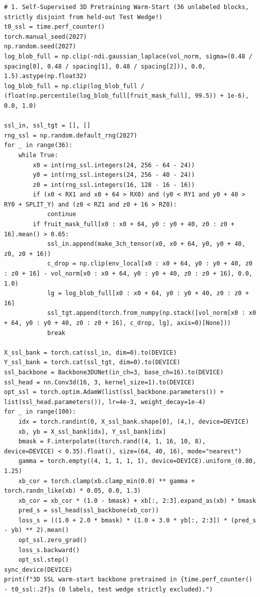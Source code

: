 \documentclass[10pt,a4paper]{article}
\begin{document}
\begin{codebox}[{In [4] $\cdot$ Python --- Step 4 -- Controlled 5-model ablation study (SSL warm-start, Organ-GPS, p=1 vs p=3, calibration)}]
\begin{lstlisting}[style=pybmed]
# 1. Self-Supervised 3D Pretraining Warm-Start (36 unlabeled blocks, strictly disjoint from held-out Test Wedge!)
t0_ssl = time.perf_counter()
torch.manual_seed(2027)
np.random.seed(2027)
log_blob_full = np.clip(-ndi.gaussian_laplace(vol_norm, sigma=(0.48 / spacing[0], 0.48 / spacing[1], 0.48 / spacing[2])), 0.0, 1.5).astype(np.float32)
log_blob_full = np.clip(log_blob_full / (float(np.percentile(log_blob_full[fruit_mask_full], 99.5)) + 1e-6), 0.0, 1.0)

ssl_in, ssl_tgt = [], []
rng_ssl = np.random.default_rng(2027)
for _ in range(36):
    while True:
        x0 = int(rng_ssl.integers(24, 256 - 64 - 24))
        y0 = int(rng_ssl.integers(24, 256 - 40 - 24))
        z0 = int(rng_ssl.integers(16, 128 - 16 - 16))
        if (x0 < RX1 and x0 + 64 > RX0) and (y0 < RY1 and y0 + 40 > RY0 + SPLIT_Y) and (z0 < RZ1 and z0 + 16 > RZ0):
            continue
        if fruit_mask_full[x0 : x0 + 64, y0 : y0 + 40, z0 : z0 + 16].mean() > 0.65:
            ssl_in.append(make_3ch_tensor(x0, x0 + 64, y0, y0 + 40, z0, z0 + 16))
            c_drop = np.clip(env_local[x0 : x0 + 64, y0 : y0 + 40, z0 : z0 + 16] - vol_norm[x0 : x0 + 64, y0 : y0 + 40, z0 : z0 + 16], 0.0, 1.0)
            lg = log_blob_full[x0 : x0 + 64, y0 : y0 + 40, z0 : z0 + 16]
            ssl_tgt.append(torch.from_numpy(np.stack([vol_norm[x0 : x0 + 64, y0 : y0 + 40, z0 : z0 + 16], c_drop, lg], axis=0)[None]))
            break

X_ssl_bank = torch.cat(ssl_in, dim=0).to(DEVICE)
Y_ssl_bank = torch.cat(ssl_tgt, dim=0).to(DEVICE)
ssl_backbone = Backbone3DUNet(in_ch=3, base_ch=16).to(DEVICE)
ssl_head = nn.Conv3d(16, 3, kernel_size=1).to(DEVICE)
opt_ssl = torch.optim.AdamW(list(ssl_backbone.parameters()) + list(ssl_head.parameters()), lr=4e-3, weight_decay=1e-4)
for _ in range(100):
    idx = torch.randint(0, X_ssl_bank.shape[0], (4,), device=DEVICE)
    xb, yb = X_ssl_bank[idx], Y_ssl_bank[idx]
    bmask = F.interpolate((torch.rand((4, 1, 16, 10, 8), device=DEVICE) < 0.35).float(), size=(64, 40, 16), mode="nearest")
    gamma = torch.empty((4, 1, 1, 1, 1), device=DEVICE).uniform_(0.80, 1.25)
    xb_cor = torch.clamp(xb.clamp_min(0.0) ** gamma + torch.randn_like(xb) * 0.05, 0.0, 1.3)
    xb_cor = xb_cor * (1.0 - bmask) + xb[:, 2:3].expand_as(xb) * bmask
    pred_s = ssl_head(ssl_backbone(xb_cor))
    loss_s = ((1.0 + 2.0 * bmask) * (1.0 + 3.0 * yb[:, 2:3]) * (pred_s - yb) ** 2).mean()
    opt_ssl.zero_grad()
    loss_s.backward()
    opt_ssl.step()
sync_device(DEVICE)
print(f"3D SSL warm-start backbone pretrained in {time.perf_counter() - t0_ssl:.2f}s (0 labels, test wedge strictly excluded).")


\end{lstlisting}
\end{codebox}
\end{document}
